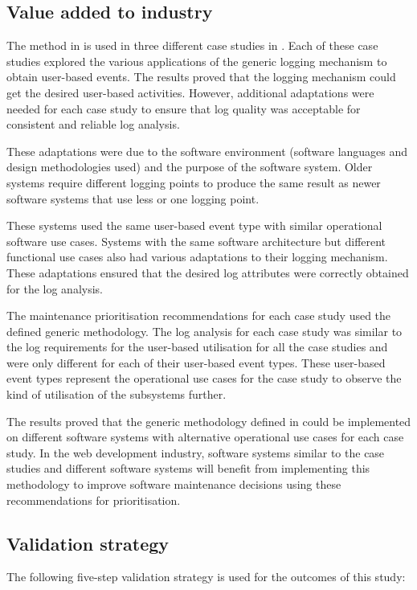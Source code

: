 \subsection{Value added to industry}
The method in  is used in three different case studies in . Each of these case studies explored the various applications of the generic logging mechanism to obtain user-based events. The results proved that the logging mechanism could get the desired user-based activities. However, additional adaptations were needed for each case study to ensure that log quality was acceptable for consistent and reliable log analysis. \par These adaptations were due to the software environment (software languages and design methodologies used) and the purpose of the software system. Older systems require different logging points to produce the same result as newer software systems that use less or one logging point. \par These systems used the same user-based event type with similar operational software use cases. Systems with the same software architecture but different functional use cases also had various adaptations to their logging mechanism. These adaptations ensured that the desired log attributes were correctly obtained for the log analysis. \par The maintenance prioritisation recommendations for each case study used the defined generic methodology. The log analysis for each case study was similar to the log requirements for the user-based utilisation for all the case studies and were only different for each of their user-based event types. These user-based event types represent the operational use cases for the case study to observe the kind of utilisation of the subsystems further. \par The results proved that the generic methodology defined in  could be implemented on different software systems with alternative operational use cases for each case study. In the web development industry, software systems similar to the case studies and different software systems will benefit from implementing this methodology to improve software maintenance decisions using these recommendations for prioritisation.

\subsection{Validation strategy}
The following five-step validation strategy is used for the outcomes of this study:

